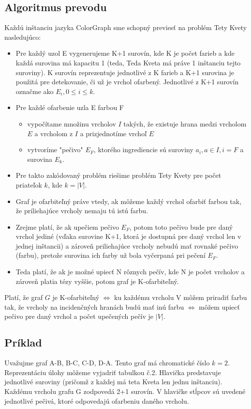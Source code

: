 \documentclass[10pt]{article}
\begin{document}
\subsection*{Algoritmus prevodu}
Každú inštanciu jazyka ColorGraph sme schopný previesť na problém Tety Kvety nasledujúco:
\begin{itemize}
    \item Pre každý uzol E vygenerujeme K+1 surovín, kde K je počet farieb a kde každá surovina má kapacitu 1 (teda, Teda
        Kveta má práve 1 inštanciu tejto suroviny). K surovín reprezentuje jednotlivé z K farieb a K+1 surovina
        je použitá pre detekovanie, či už je vrchol ofarbený.
        Jednotlivé z K+1 surovín označme ako $E_i, 0 \leq i \leq k$.
    \item Pre každé ofarbenie uzla E farbou F 
    \begin{itemize}
        \item vypočítame množinu vrcholov $I$ takých, že existuje hrana medzi vrcholom $E$ a vrcholom z
            $I$ a prizjednotíme vrchoľ $E$
        \item vytvoríme "pečivo" $E_F$, ktorého ingrediencie sú suroviny $a_i, a \in I, i = F$ a
            surovina $E_k$.
    \end{itemize}
    \item Pre takto zakódovaný problém riešime problém Tety Kvety pre počet priateľok $k$, kde $k = |V|$.
    \item Graf je ofarbiteľný práve vtedy, ak môžeme každý vrchol ofarbiť farbou tak, že
        priliehajúce vrcholy nemaju tú istú farbu.
    \item Zrejme platí, že ak upečiem pečivo $E_F$, potom toto pečivo bude pre daný vrchol jediné
        (vďaka surovine K+1, ktorá je dostupná pre daný vrchol len v jednej inštancii) a zároveň priliehajúce vrcholy nebudú mať rovnaké pečivo (farbu),
        pretože surovina ich farby už bola vyčerpaná pri pečení $E_F$.
    \item Teda platí, že ak je možné upiecť N rôznych pečív, kde N je počet vrcholov a zároveň
        platia tézy vyššie, potom graf je K-ofarbiteľný.
\end{itemize}

Platí, že graf $G$ je K-ofarbiteľný $\iff$ ku každému vrcholu V môžem priradiť farbu tak, že vrcholy na incidenčných hranách budú mať inú farbu $\iff$ môžem upiecť pečivo pre daný vrchol a počet upečených pečív je $|V|$.
\subsection*{Príklad}
Uvažujme graf A-B, B-C, C-D, D-A. Tento graf má chromatické číslo $k = 2$. 
Reprezentáciu úlohy môžeme vyjadriť tabulkou č.2. Hlavička predstavuje jednotlivé suroviny (pričomž z každej má teta Kveta len jednu inštanciu). Každému vrcholu grafu G zodpovedá 2+1 surovín.
V hlavičke stĺpcov sú uvedené jednotlivé pečivá, ktoré odpovedajú ofarbeniu daného vrcholu.
\end{document}
